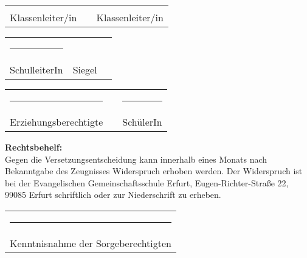 {\begin{minipage}[t][.99\textheight][t]{.97\textwidth}
		\vspace{2.5cm}\par
		\begin{tabularx}{\linewidth}{C{.4\linewidth}Y C{.4\linewidth}}
			\hrulefill & & \hrulefill \\[6pt]
			Klassenleiter/in & & Klassenleiter/in\\
		\end{tabularx}
		\vspace{2.5cm}\par
		\begin{tabularx}{\linewidth}{C{.4\linewidth}Y C{.4\linewidth}}
			\rule{\linewidth}{1pt} & & \\[-.7ex]
			{\centering SchulleiterIn} & {\tiny Siegel} & \\%
		\end{tabularx}		
		\vspace{2.5cm}\par
		\begin{tabularx}{\linewidth}{C{.4\linewidth}X C{.4\linewidth}}
			\rule{\linewidth}{1pt} & & \rule{\linewidth}{1pt}\\%
			{\centering Erziehungsberechtigte} & &	{\centering SchülerIn}\\%
		\end{tabularx}		
		\vfill		
		{\footnotesize
			\textbf{Rechtsbehelf:}\\
			Gegen die Versetzungsentscheidung kann innerhalb eines Monats nach
			Bekanntgabe des Zeugnisses Widerspruch erhoben werden. Der Widerspruch
			ist bei der Evangelischen Gemeinschaftsschule Erfurt,
			Eugen-Richter-Straße 22, 99085 Erfurt schriftlich oder zur Niederschrift
			zu erheben.\\[3em]
			\begin{tabularx}{\linewidth}{C{.6\linewidth}}
				\rule{\linewidth}{1pt} \\[-.3ex]
				{\centering Kenntnisnahme der Sorgeberechtigten}\\%
			\end{tabularx}
		}
	\end{minipage}%
}%